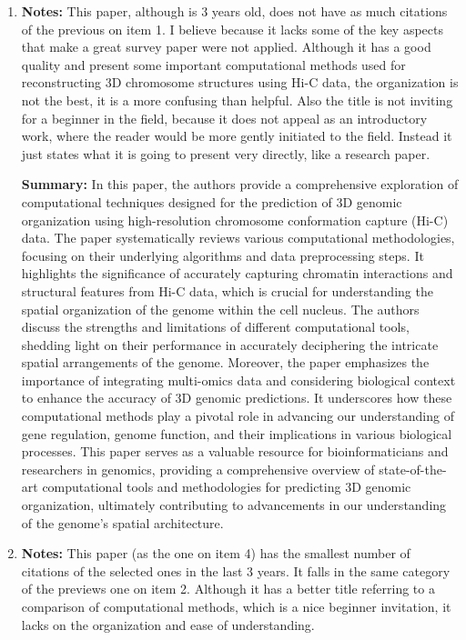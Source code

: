 \begin{enumerate}
    \item \textbf{Notes:} This paper, although is 3 years old, does not have as much citations of the previous on item 1. I believe because it lacks some of the key aspects that make a great survey paper were not applied. Although it has a good quality and present some important computational methods used for reconstructing 3D chromosome structures using Hi-C data, the organization is not the best, it is a more confusing than helpful. Also the title is not inviting for a beginner in the field, because it does not appeal as an introductory work, where the reader would be more gently initiated to the field. Instead it just states what it is going to present very directly, like a research paper.
    
    \textbf{Summary:} In this paper, the authors provide a comprehensive exploration of computational techniques designed for the prediction of 3D genomic organization using high-resolution chromosome conformation capture (Hi-C) data. The paper systematically reviews various computational methodologies, focusing on their underlying algorithms and data preprocessing steps. It highlights the significance of accurately capturing chromatin interactions and structural features from Hi-C data, which is crucial for understanding the spatial organization of the genome within the cell nucleus. The authors discuss the strengths and limitations of different computational tools, shedding light on their performance in accurately deciphering the intricate spatial arrangements of the genome. Moreover, the paper emphasizes the importance of integrating multi-omics data and considering biological context to enhance the accuracy of 3D genomic predictions. It underscores how these computational methods play a pivotal role in advancing our understanding of gene regulation, genome function, and their implications in various biological processes. This paper serves as a valuable resource for bioinformaticians and researchers in genomics, providing a comprehensive overview of state-of-the-art computational tools and methodologies for predicting 3D genomic organization, ultimately contributing to advancements in our understanding of the genome's spatial architecture.
    
    \item \textbf{Notes:} This paper (as the one on item 4) has the smallest number of citations of the selected ones in the last 3 years. It falls in the same category of the previews one on item 2. Although it has a better title referring to a comparison of computational methods, which is a nice beginner invitation, it lacks on the organization and ease of understanding.
    

\end{enumerate}
